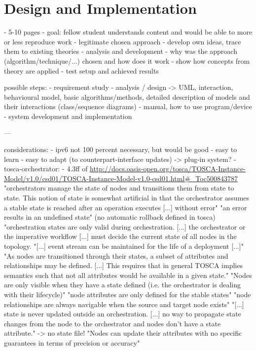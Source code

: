 \chapter{Design and Implementation} %

- 5-10 pages
- goal: fellow student understands content and would be able to more or less reproduce work
- legitimate chosen approach
- develop own ideas, trace them to existing theories
- analysis and development
- why was the approach (algorithm/technique/...) chosen and how does it work
- show how concepts from theory are applied
- test setup and achieved results

possible steps:
- requirement study
- analysis / design -> UML, interaction, behavioural model, basic algorithms/methods, detailed description of models and their interactions (class/sequence diagrams)
- manual, how to use program/device
- system development and implementation

---

considerations:
- ipv6 not 100 percent necessary, but would be good
- easy to learn
- easy to adapt (to counterpart-interface updates) -> plug-in system?
- tosca-orchestrator:
  - 4.3ff of \url{http://docs.oasis-open.org/tosca/TOSCA-Instance-Model/v1.0/csd01/TOSCA-Instance-Model-v1.0-csd01.html#_Toc500843787}
    "orchestrators manage the state of nodes and transitions them from state to state. This notion of state is somewhat artificial in that the orchestrator assumes a stable state is reached after an operation executes [...] without error"
    "an error results in an undefined state" (no automatic rollback defined in tosca)
    "orchestration states are only valid during orchestration. [...] the orchestrator or the imperative workflow [...] must decide the current state of all nodes in the topology.
    "[...] event stream can be maintained for the life of a deployment [...]"
    "As nodes are transitioned through their states, a subset of attributes and relationships may be defined. [...] This requires that in general TOSCA implies semantics such that not all attributes would be available in a given state."
    "Nodes are only visible when they have a state defined (i.e. the orchestrator is dealing with their lifecycle)"
    "node attributes are only defined for the stable states"
    "node relationships are always navigable when the source and target node exists"
    "[...] state is never updated outside an orchestration. [...] no way to propagate state changes from the node to the orchestrator and nodes don't have a state attribute."
      -> no state file!
    "Nodes can update their attributes with no specific guarantees in terms of precision or accuracy"

